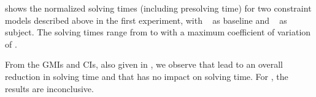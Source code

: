  shows the normalized
solving times (including \gls{presolving} time) for two \glspl{constraint model}
described above in the first experiment, with ~ as \gls{baseline} and
~ as \gls{subject}.
%
The solving times range from
\printMinSolvingTime{
  \SolvTechDisableDomConsLocsOfStatesPrePlusSolvingTimeSpeedupAllPrePlusSolvingTimeAvgMin,
  \SolvTechDisableDomConsLocsOfStatesPrePlusSolvingTimeSpeedupPrePlusSolvingTimeAvgMin,
  \SolvTechDisableDomConsOperandsOfNonSelectedMatchesPrePlusSolvingTimeSpeedupPrePlusSolvingTimeAvgMin,
  \SolvTechDisableImplConsInputOperandsNotTakingMinValuePrePlusSolvingTimeSpeedupPrePlusSolvingTimeAvgMin,
  \SolvTechDisableDomConsInterchDataChainsPrePlusSolvingTimeSpeedupPrePlusSolvingTimeAvgMin,
  \SolvTechDisableDomConsNullCopyMatchSelectionPrePlusSolvingTimeSpeedupPrePlusSolvingTimeAvgMin,
  \SolvTechDisableDomConsKillMatchSelectionPrePlusSolvingTimeSpeedupPrePlusSolvingTimeAvgMin
} to
\printMaxSolvingTime{
  \SolvTechDisableDomConsLocsOfStatesPrePlusSolvingTimeSpeedupAllPrePlusSolvingTimeAvgMax,
  \SolvTechDisableDomConsLocsOfStatesPrePlusSolvingTimeSpeedupPrePlusSolvingTimeAvgMax,
  \SolvTechDisableDomConsOperandsOfNonSelectedMatchesPrePlusSolvingTimeSpeedupPrePlusSolvingTimeAvgMax,
  \SolvTechDisableImplConsInputOperandsNotTakingMinValuePrePlusSolvingTimeSpeedupPrePlusSolvingTimeAvgMax,
  \SolvTechDisableDomConsInterchDataChainsPrePlusSolvingTimeSpeedupPrePlusSolvingTimeAvgMax,
  \SolvTechDisableDomConsNullCopyMatchSelectionPrePlusSolvingTimeSpeedupPrePlusSolvingTimeAvgMax,
  \SolvTechDisableDomConsKillMatchSelectionPrePlusSolvingTimeSpeedupPrePlusSolvingTimeAvgMax
} with a maximum coefficient of variation of
\numMaxOf{
  \SolvTechDisableDomConsLocsOfStatesPrePlusSolvingTimeSpeedupAllPrePlusSolvingTimeCvMax,
  \SolvTechDisableDomConsLocsOfStatesPrePlusSolvingTimeSpeedupPrePlusSolvingTimeCvMax,
  \SolvTechDisableDomConsOperandsOfNonSelectedMatchesPrePlusSolvingTimeSpeedupPrePlusSolvingTimeCvMax,
  \SolvTechDisableImplConsInputOperandsNotTakingMinValuePrePlusSolvingTimeSpeedupPrePlusSolvingTimeCvMax,
  \SolvTechDisableDomConsInterchDataChainsPrePlusSolvingTimeSpeedupPrePlusSolvingTimeCvMax,
  \SolvTechDisableDomConsNullCopyMatchSelectionPrePlusSolvingTimeSpeedupPrePlusSolvingTimeCvMax,
  \SolvTechDisableDomConsKillMatchSelectionPrePlusSolvingTimeSpeedupPrePlusSolvingTimeCvMax
}.

From the \glspl{GMI} and \glspl{CI}, also given in
, we observe that
 lead to an overall reduction in solving time
and that  has no
impact on solving time.
%
For , the
results are inconclusive.

